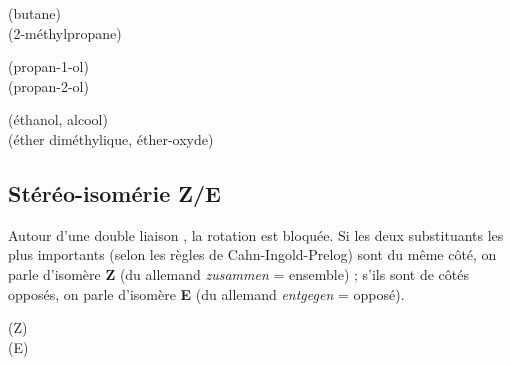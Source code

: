 \begin{exemple}
\begin{center}
\begin{illus}
 \quad (butane)\\[4pt]
 \quad (2-méthylpropane)
\end{illus}
\end{center}
\end{exemple}

\begin{exemple}
\begin{center}
\begin{illus}
 \quad (propan-1-ol)\\[4pt]
 \quad (propan-2-ol)
\end{illus}
\end{center}
\end{exemple}

\begin{exemple}
\begin{center}
\begin{illus}
 \quad (éthanol, alcool)\\[4pt]
 \quad (éther diméthylique, éther-oxyde)
\end{illus}
\end{center}
\end{exemple}

\subsection{Stéréo-isomérie Z/E}

\begin{definition}[Isomérie Z/E]
Autour d'une double liaison , la rotation est bloquée. Si les deux substituants les plus importants (selon les règles de Cahn-Ingold-Prelog) sont du même côté, on parle d'isomère \textbf{Z} (du allemand \textit{zusammen} = ensemble) ; s'ils sont de côtés opposés, on parle d'isomère \textbf{E} (du allemand \textit{entgegen} = opposé).
\end{definition}

\begin{exemple}
\begin{center}
\begin{illus}
 \quad (Z)\\[4pt]
 \quad (E)
\end{illus}
\end{center}
\end{exemple}


